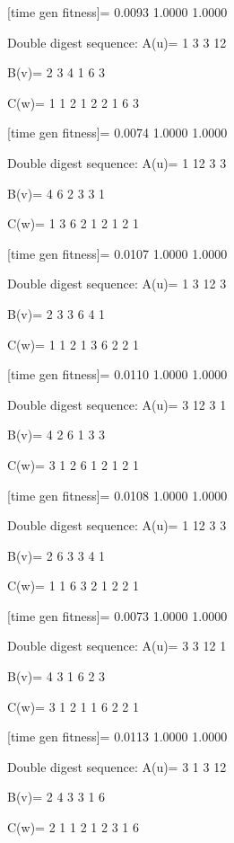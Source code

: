 [time gen fitness]=
    0.0093    1.0000    1.0000

Double digest sequence:
A(u)=
     1     3     3    12

B(v)=
     2     3     4     1     6     3

C(w)=
     1     1     2     1     2     2     1     6     3

[time gen fitness]=
    0.0074    1.0000    1.0000

Double digest sequence:
A(u)=
     1    12     3     3

B(v)=
     4     6     2     3     3     1

C(w)=
     1     3     6     2     1     2     1     2     1

[time gen fitness]=
    0.0107    1.0000    1.0000

Double digest sequence:
A(u)=
     1     3    12     3

B(v)=
     2     3     3     6     4     1

C(w)=
     1     1     2     1     3     6     2     2     1

[time gen fitness]=
    0.0110    1.0000    1.0000

Double digest sequence:
A(u)=
     3    12     3     1

B(v)=
     4     2     6     1     3     3

C(w)=
     3     1     2     6     1     2     1     2     1

[time gen fitness]=
    0.0108    1.0000    1.0000

Double digest sequence:
A(u)=
     1    12     3     3

B(v)=
     2     6     3     3     4     1

C(w)=
     1     1     6     3     2     1     2     2     1

[time gen fitness]=
    0.0073    1.0000    1.0000

Double digest sequence:
A(u)=
     3     3    12     1

B(v)=
     4     3     1     6     2     3

C(w)=
     3     1     2     1     1     6     2     2     1

[time gen fitness]=
    0.0113    1.0000    1.0000

Double digest sequence:
A(u)=
     3     1     3    12

B(v)=
     2     4     3     3     1     6

C(w)=
     2     1     1     2     1     2     3     1     6

